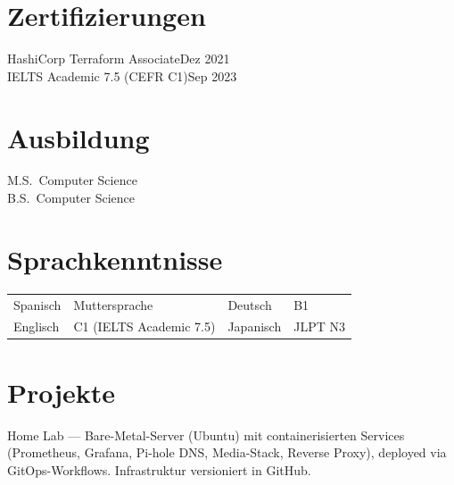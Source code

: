 \documentclass[a4paper,9pt]{extarticle}
\begin{document}

\section{Zertifizierungen}

{\mediumfont HashiCorp Terraform Associate}\hfill{\small\color{graytext}Dez 2021}\\
{\mediumfont IELTS Academic 7.5 (CEFR C1)}\hfill{\small\color{graytext}Sep 2023}


\section{Ausbildung}

{\mediumfont M.S.\ Computer Science}\\
{\mediumfont B.S.\ Computer Science}


\section{Sprachkenntnisse}

{\small
\begin{tabularx}{\textwidth}{@{}l X l X@{}}
  \mediumfont Spanisch & Muttersprache & \mediumfont Deutsch & B1 \\
  \mediumfont Englisch & C1 (IELTS Academic 7.5) & \mediumfont Japanisch & JLPT N3 \\
\end{tabularx}
}


\section{Projekte}
{\mediumfont Home Lab} --- Bare-Metal-Server (Ubuntu) mit containerisierten Services (Prometheus, Grafana, Pi-hole DNS, Media-Stack, Reverse Proxy), deployed via GitOps-Workflows. Infrastruktur versioniert in GitHub.
\end{document}
